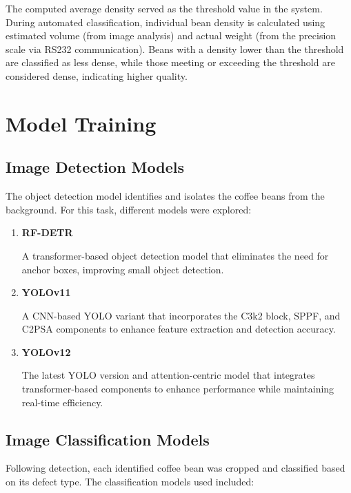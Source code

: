 The computed average density served as the threshold value in the system. During automated classification, individual bean density is calculated using estimated volume (from image analysis) and actual weight (from the precision scale via RS232 communication). Beans with a density lower than the threshold are classified as less dense, while those meeting or exceeding the threshold are considered dense, indicating higher quality.

\section{Model Training}

\subsection{Image Detection Models}

The object detection model identifies and isolates the coffee beans from the background. For this task, different models were explored:

\begin{enumerate}
	\item \textbf{RF-DETR}
	 
	A transformer-based object detection model that eliminates the need for anchor boxes, improving small object detection.

	\item \textbf{YOLOv11}
	
	A CNN-based YOLO variant that incorporates the C3k2 block, SPPF, and C2PSA components to enhance feature extraction and detection accuracy.

	\item \textbf{YOLOv12}
	
	The latest YOLO version and attention-centric model that integrates transformer-based components to enhance performance while maintaining real-time efficiency.
\end{enumerate}

\subsection{Image Classification Models}
Following detection, each identified coffee bean was cropped and classified based on its defect type. The classification models used included:

